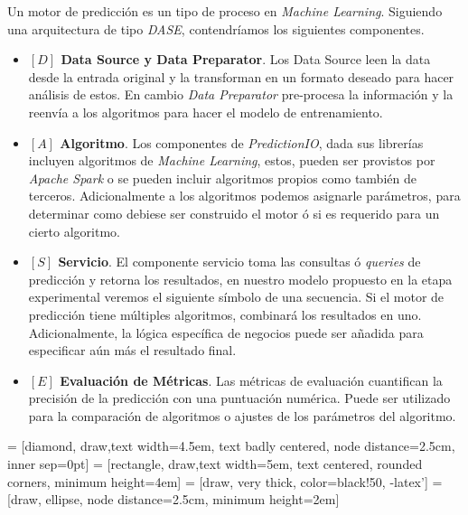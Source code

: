Un motor de predicción es un tipo de proceso en \emph{Machine Learning}. Siguiendo una arquitectura de tipo \emph{DASE}, contendríamos los siguientes componentes.



\begin{itemize}

  \item\label{dase-datasource} \textbf{ $[D]$ Data Source y Data Preparator}. Los Data Source leen la data desde la entrada original y la transforman en un formato deseado para hacer análisis de estos. En cambio \emph{Data Preparator} pre-procesa la información y la reenvía a los algoritmos para   hacer el modelo de entrenamiento.


  \item\label{dase-algoritmo} \textbf{ $[A]$ Algoritmo}. Los componentes de \emph{PredictionIO}, dada sus librerías incluyen algoritmos de \emph{Machine Learning}, estos, pueden ser provistos por \emph{Apache Spark} o se pueden incluir algoritmos propios como también de terceros.
    Adicionalmente a los algoritmos podemos asignarle parámetros, para determinar como debiese ser construido el motor ó si es requerido para un cierto algoritmo.



  \item\label{dase-servicio} \textbf{ $[S]$ Servicio}. El componente servicio toma las consultas ó \emph{queries} de predicción y retorna los resultados, en nuestro modelo propuesto en la etapa experimental veremos el siguiente símbolo de una secuencia. 
  Si el motor de predicción tiene múltiples algoritmos, combinará los resultados en uno. Adicionalmente, la lógica específica de negocios puede ser añadida para especificar aún más el resultado final. 
 
  \item\label{dase-eval} \textbf{ $[E]$ Evaluación de Métricas}.
Las métricas de evaluación cuantifican la precisión de la predicción con una puntuación numérica. Puede ser utilizado para la comparación de algoritmos o ajustes de los parámetros del algoritmo.
\end{itemize}




   = [diamond, draw,text width=4.5em, text badly centered, node distance=2.5cm, inner sep=0pt]
   = [rectangle, draw,text width=5em, text centered, rounded corners, minimum height=4em]
   = [draw, very thick, color=black!50, -latex']
   = [draw, ellipse, node distance=2.5cm,
  minimum height=2em]


